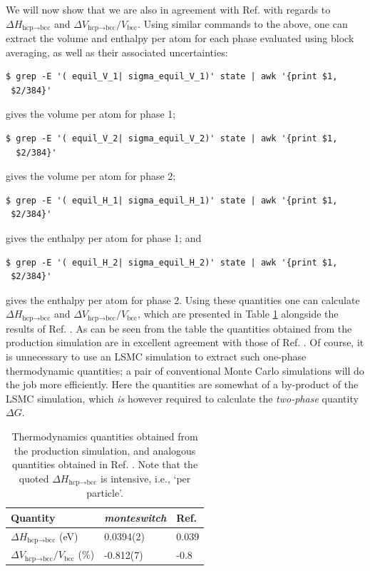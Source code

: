 \documentclass{report}
\begin{document}
We will now show that we are also in agreement with Ref. \cite{Mendelev_2007} with regards to $\Delta H_{\text{hcp$\to$bcc}}$ and 
$\Delta V_{\text{hcp$\to$bcc}}/V_{\text{bcc}}$. Using similar commands to the above, one can extract the volume and enthalpy per atom for each phase
evaluated using block averaging, as well as their associated uncertainties:
\begin{verbatim}
$ grep -E '( equil_V_1| sigma_equil_V_1)' state | awk '{print $1,
 $2/384}'
\end{verbatim}
gives the volume per atom for phase 1;
\begin{verbatim}
$ grep -E '( equil_V_2| sigma_equil_V_2)' state | awk '{print $1,
  $2/384}'
\end{verbatim}
gives the volume per atom for phase 2;
\begin{verbatim}
$ grep -E '( equil_H_1| sigma_equil_H_1)' state | awk '{print $1,
 $2/384}'
\end{verbatim}
gives the enthalpy per atom for phase 1; and
\begin{verbatim}
$ grep -E '( equil_H_2| sigma_equil_H_2)' state | awk '{print $1,
 $2/384}'
\end{verbatim}
gives the enthalpy per atom for phase 2. Using these quantities one can calculate $\Delta H_{\text{hcp$\to$bcc}}$ and $\Delta V_{\text{hcp$\to$bcc}}/V_{\text{bcc}}$,
which are presented in Table \ref{table:production_results} alongside the results of Ref. \cite{Mendelev_2007}. As can be seen from the table
the quantities obtained from the production simulation are in excellent agreement with those of Ref. \cite{Mendelev_2007}. Of course, it is unnecessary 
to use an LSMC simulation to extract such one-phase thermodynamic quantities; a pair of conventional Monte Carlo simulations will do the job more 
efficiently. Here the quantities are somewhat of a by-product of the LSMC simulation, which \emph{is} however required to calculate the \emph{two-phase}
quantity $\Delta G$.

\begin{table}\label{table:production_results}
\begin{center}
\begin{tabular}{l  l  l }
Quantity                                  &  \emph{monteswitch}      & Ref. \cite{Mendelev_2007} \\
                                                        \hline
$\Delta H_{\text{hcp$\to$bcc}}$ (eV)                 & 0.0394(2)                & 0.039                     \\
$\Delta V_{\text{hcp$\to$bcc}}/V_{\text{bcc}}$ (\%)          & -0.812(7)                & -0.8                      \\
\end{tabular}
\caption{Thermodynamics quantities obtained from the production simulation, and analogous quantities obtained in Ref.  \cite{Mendelev_2007}. Note that
the quoted $\Delta H_{\text{hcp$\to$bcc}}$ is intensive, i.e., `per particle'.}
\end{center}
\end{table}
\end{document}
